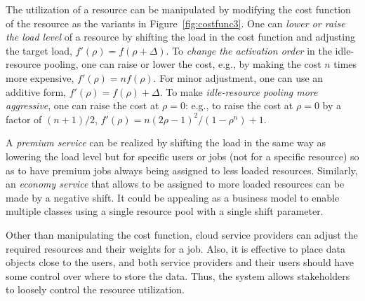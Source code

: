 The utilization of a resource can be manipulated by modifying the cost
function of the resource as the variants in Figure~\ref{fig:costfunc3}.
One can {\em lower or raise the load level} of a resource by shifting
the load in the cost function and adjusting the target load,
$f'(\rho) = f(\rho + \Delta)$.
To {\em change the activation order} in the idle-resource pooling,
one can raise or lower the cost,
e.g., by making the cost  $n$ times more expensive, $f'(\rho) = n f(\rho)$.
For minor adjustment, one can use an additive form,
$f'(\rho) = f(\rho) + \Delta$.
To make {\em idle-resource pooling more aggressive},
one can raise the cost at $\rho = 0$:
e.g., to raise the cost at $\rho = 0$ by a factor of $(n+1)/2$,
$f'(\rho) = n (2\rho - 1)^{2}/(1 - \rho^{n}) + 1$.

A {\em premium service} can be realized by shifting the load
in the same way as lowering the load level
but for specific users or jobs (not for a specific resource) so as to
have premium jobs always being assigned to less loaded resources.
Similarly, an {\em economy service} that allows to be assigned to more
loaded resources can be made by a negative shift.
It could be appealing as a business model to enable multiple classes using a single
resource pool with a single shift parameter.


Other than manipulating the cost function,
cloud service providers can adjust the required resources and their
weights for a job.  Also, it is effective to place data objects close to the
users, and both service providers and their users should have some
control over where to store the data.
Thus, the system allows stakeholders to loosely control the
resource utilization.

